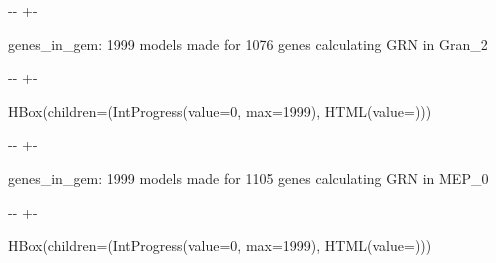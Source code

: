 \documentclass[letterpaper,10pt,english]{sphinxmanual}
\newlength\nbsphinxcodecellspacing
\begin{document}
%
{
\kern-\sphinxverbatimsmallskipamount\kern-\baselineskip
\kern+\FrameHeightAdjust\kern-\fboxrule
\vspace{\nbsphinxcodecellspacing}
%
\begin{sphinxVerbatim}[commandchars=\\\{\}]

genes\_in\_gem: 1999
models made for 1076 genes
calculating GRN in Gran\_2
\end{sphinxVerbatim}
}
\relax

{

\kern-\sphinxverbatimsmallskipamount\kern-\baselineskip
\kern+\FrameHeightAdjust\kern-\fboxrule
\vspace{\nbsphinxcodecellspacing}

%
\begin{sphinxVerbatim}[commandchars=\\\{\}]
HBox(children=(IntProgress(value=0, max=1999), HTML(value=\PYGZsq{}\PYGZsq{})))
\end{sphinxVerbatim}
}



%
{
\kern-\sphinxverbatimsmallskipamount\kern-\baselineskip
\kern+\FrameHeightAdjust\kern-\fboxrule
\vspace{\nbsphinxcodecellspacing}
%
\begin{sphinxVerbatim}[commandchars=\\\{\}]

genes\_in\_gem: 1999
models made for 1105 genes
calculating GRN in MEP\_0
\end{sphinxVerbatim}
}
\relax

{

\kern-\sphinxverbatimsmallskipamount\kern-\baselineskip
\kern+\FrameHeightAdjust\kern-\fboxrule
\vspace{\nbsphinxcodecellspacing}

%
\begin{sphinxVerbatim}[commandchars=\\\{\}]
HBox(children=(IntProgress(value=0, max=1999), HTML(value=\PYGZsq{}\PYGZsq{})))
\end{sphinxVerbatim}
}
\end{document}
